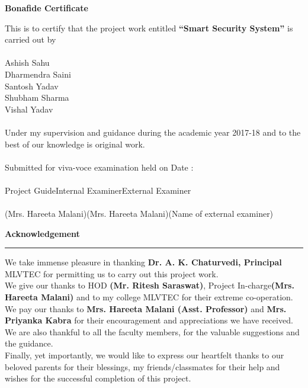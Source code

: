 \documentclass[twoside,a4paper,16pt]{book}
\begin{document}
{		\begin{center}
			\huge{\bf Bonafide Certificate} 
		\end{center}
		\vspace{2cm}
		{\large This is to certify that the project work entitled {\bf “Smart Security System”} is carried out by\\
			\vspace{.5cm}\\
			Ashish Sahu \\
			Dharmendra Saini\\
			Santosh Yadav\\
			Shubham Sharma\\
			Vishal Yadav\\
			\\
			Under my supervision and guidance during the academic year 2017-18 and to the best of our knowledge is original work.\\
			\\
			Submitted for viva-voce examination held on Date :\\
			\vspace{2cm}\\
			Project Guide\hspace{3.5cm}Internal Examiner\hspace{3.5cm}External Examiner\\
			\vspace{1cm}\\
			(Mrs. Hareeta Malani)\hspace{1.8cm}(Mrs. Hareeta Malani)\hspace{2.8cm}(Name of external examiner)
			\newpage
			\begin{center}
				\huge{\bf Acknowledgement} 
			\end{center}
		{\rule{190mm}{0.2mm}}
			\vspace{1.5cm}
			
			{\large We take immense pleasure in thanking {\bf Dr. A. K. Chaturvedi, Principal} MLVTEC for permitting us to carry out this project work.\\
				We give our thanks to HOD {\bf (Mr. Ritesh Saraswat)}, Project In-charge{\bf (Mrs. Hareeta Malani)} and to my college MLVTEC for their extreme co-operation.\\
				We pay our thanks to {\bf Mrs. Hareeta Malani (Asst. Professor)} and {\bf Mrs. Priyanka Kabra} for their encouragement and appreciations we have received.\\
				We are also thankful to all the faculty members, for the valuable suggestions and the guidance.\\
				Finally, yet importantly, we would like to express our heartfelt thanks to our beloved parents for their blessings, my friends/classmates for their help and wishes for the successful completion of this project.\\
				
}}}
\end{document}
